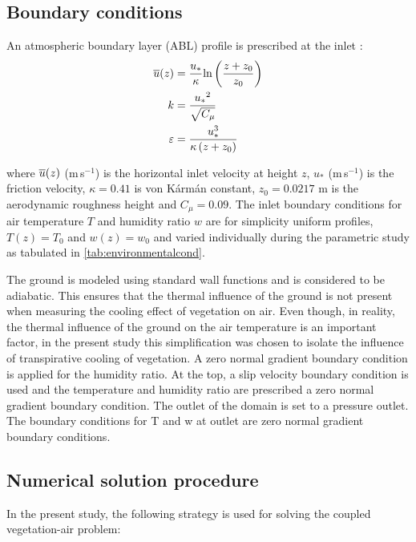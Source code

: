 \subsection{Boundary conditions}

An atmospheric boundary layer (ABL) profile is prescribed at the inlet \citep{Richards1993}:
\begin{align}
\overline{u}(z) &= \frac{{{u_*}}}{\kappa }{\text{ln}}\left( {\frac{{z + {z_0}}}{{{z_0}}}} \right) \\
k &= \frac{{{u_*}^2}}{{\sqrt {{C_\mu }} }} \\
\varepsilon  &= \frac{{u_*^3}}{{\kappa \left( {z + {z_0}} \right)}}
\end{align}

where $\overline{u}(z)$ (m\,s$^{-1}$) is the horizontal inlet velocity at height $z$, $u_*$ (m\,s$^{-1}$) is the friction velocity, $\kappa=0.41$ is von K\'arm\'an constant, $z_0=\num{0.0217}$ m is the aerodynamic roughness height and $C_{\mu}=0.09$. The inlet boundary conditions for air temperature $T$ and humidity ratio $w$ are for simplicity uniform profiles, $T(z)=T_0$ and $w(z)=w_0$ and varied individually during the parametric study as tabulated in \cref{tab:environmentalcond}.

The ground is modeled using standard wall functions and is considered to be adiabatic. This ensures that the thermal influence of the ground is not present when measuring the cooling effect of vegetation on air. Even though, in reality, the thermal influence of the ground on the air temperature is an important factor, in the present study this simplification was chosen to isolate the influence of transpirative cooling of vegetation. A zero normal gradient boundary condition is applied for the humidity ratio. At the top, a slip velocity boundary condition is used and the temperature and humidity ratio are prescribed a zero normal gradient boundary condition. The outlet of the domain is set to a pressure outlet. The boundary conditions for T and w at outlet are zero normal gradient boundary conditions. 

\subsection{Numerical solution procedure}

In the present study, the following strategy is used for solving the coupled vegetation-air problem:

